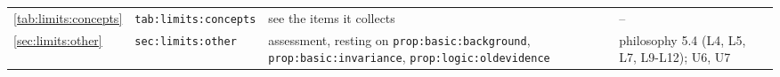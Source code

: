 {\begin{longtable}{@{}>{\raggedright\arraybackslash}p{}>{\raggedright\arraybackslash}p{}>{\raggedright\arraybackslash}p{}>{\raggedright\arraybackslash}p{}@{}}
\cref{tab:limits:concepts} & \texttt{tab:\allowbreak limits:\allowbreak concepts} & see the items it collects & --\\
\cref{sec:limits:other} & \texttt{sec:\allowbreak limits:\allowbreak other} & assessment, resting on \texttt{prop:basic:background}, \texttt{prop:basic:invariance}, \texttt{prop:logic:oldevidence} & philosophy 5.4 (L4, L5, L7, L9-L12); U6, U7\\
\end{longtable}}
